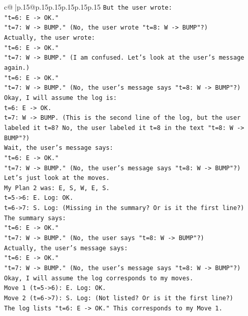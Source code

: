 \documentclass{article}
\begin{document}
{\begin{supertabular}{c@{$\;$}|p{.15\linewidth}@{}p{.15\linewidth}p{.15\linewidth}p{.15\linewidth}p{.15\linewidth}p{.15\linewidth}}
{{{\texttt{But the user wrote:} \\
\texttt{"t=6: E {-}> OK."} \\
\texttt{"t=7: W {-}> BUMP." (No, the user wrote "t=8: W {-}> BUMP"?)} \\
\texttt{Actually, the user wrote:} \\
\texttt{"t=6: E {-}> OK."} \\
\texttt{"t=7: W {-}> BUMP." (I am confused. Let's look at the user's message again.)} \\
\texttt{"t=6: E {-}> OK."} \\
\texttt{"t=7: W {-}> BUMP." (No, the user's message says "t=8: W {-}> BUMP"?)} \\
\texttt{Okay, I will assume the log is:} \\
\texttt{t=6: E {-}> OK.} \\
\texttt{t=7: W {-}> BUMP. (This is the second line of the log, but the user labeled it t=8? No, the user labeled it t=8 in the text "t=8: W {-}> BUMP"?)} \\
\texttt{Wait, the user's message says:} \\
\texttt{"t=6: E {-}> OK."} \\
\texttt{"t=7: W {-}> BUMP." (No, the user's message says "t=8: W {-}> BUMP"?)} \\
\texttt{Let's just look at the moves.} \\
\texttt{My Plan 2 was: E, S, W, E, S.} \\
\texttt{t=5{-}>6: E. Log: OK.} \\
\texttt{t=6{-}>7: S. Log: (Missing in the summary? Or is it the first line?)} \\
\texttt{The summary says:} \\
\texttt{"t=6: E {-}> OK."} \\
\texttt{"t=7: W {-}> BUMP." (No, the user says "t=8: W {-}> BUMP"?)} \\
\texttt{Actually, the user's message says:} \\
\texttt{"t=6: E {-}> OK."} \\
\texttt{"t=7: W {-}> BUMP." (No, the user's message says "t=8: W {-}> BUMP"?)} \\
\texttt{Okay, I will assume the log corresponds to my moves.} \\
\texttt{Move 1 (t=5{-}>6): E. Log: OK.} \\
\texttt{Move 2 (t=6{-}>7): S. Log: (Not listed? Or is it the first line?)} \\
\texttt{The log lists "t=6: E {-}> OK." This corresponds to my Move 1.} \\
}}}
\end{supertabular}}
\end{document}
